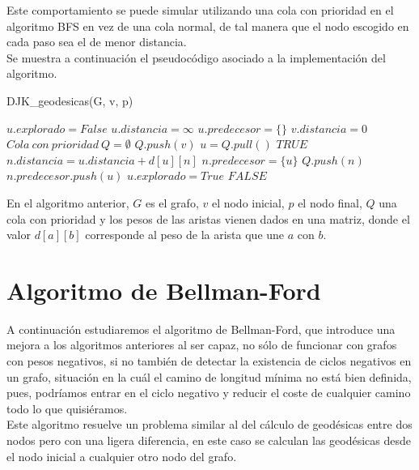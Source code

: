 Este comportamiento se puede simular utilizando una cola con prioridad en el algoritmo BFS en vez de una cola normal, de tal manera que el nodo escogido en cada paso sea el de menor distancia. \\

Se muestra a continuación el pseudocódigo asociado a la implementación del algoritmo.

\begin{breakablealgorithm}
	\caption{DJK\_geodesicas(G, v, p)}
	\begin{algorithmic}[1]
			\State $u.explorado = False$
			\State $u.distancia = \infty$
			\State $u.predecesor = \{\}$
		\EndFor
		\State $v.distancia = 0$
		\State $Cola\ con\ prioridad\ Q = \emptyset$
		\State $Q.push(v)$
			\State $u = Q.pull()$
				\Return $TRUE$
			\EndIf
						\State $n.distancia = u.distancia + d[u][n]$
						\State $n.predecesor = \{u\}$
						\State $Q.push(n)$
					\ElsIf{$n.distancia == u.distancia + d[u][n]$}
						\State $n.predecesor.push(u)$
					\EndIf
				\EndIf
			\EndFor
			\State $u.explorado = True$
		\EndWhile
		\Return $FALSE$
	\end{algorithmic}
\end{breakablealgorithm}

En el algoritmo anterior, $G$ es el grafo, $v$ el nodo inicial, $p$ el nodo final, $Q$ una cola con prioridad y los pesos de las aristas vienen dados en una matriz, donde el valor $d[a][b]$ corresponde al peso de la arista que une $a$ con $b$.

\section{Algoritmo de Bellman-Ford}

A continuación estudiaremos el algoritmo de Bellman-Ford, que introduce una mejora a los algoritmos anteriores al ser capaz, no sólo de funcionar con grafos con pesos negativos, si no también de detectar la existencia de ciclos negativos en un grafo, situación en la cuál el camino de longitud mínima no está bien definida, pues, podríamos entrar en el ciclo negativo y reducir el coste de cualquier camino todo lo que quisiéramos. \\

Este algoritmo resuelve un problema similar al del cálculo de geodésicas entre dos nodos pero con una ligera diferencia, en este caso se calculan las geodésicas desde el nodo inicial a cualquier otro nodo del grafo. \\

